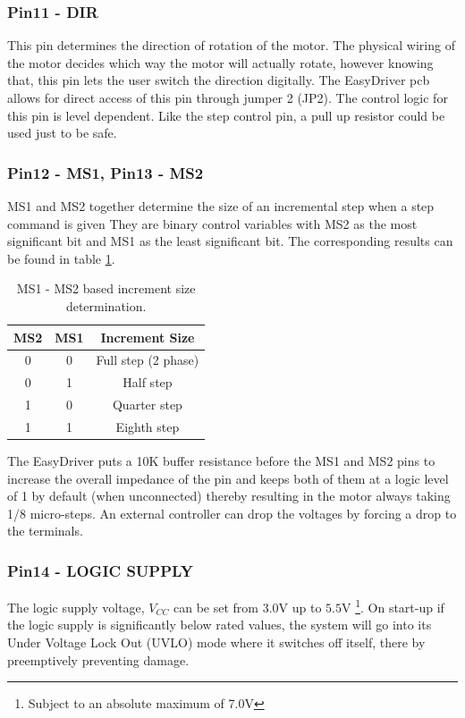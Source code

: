 \documentclass{article}
\theoremstyle{plain}
\theoremstyle{definition}
\theoremstyle{remark}
\begin{document}
\subsubsection*{Pin11 - DIR}
This pin determines the direction of rotation of the motor. The physical wiring of the motor decides which way the motor will actually rotate, however knowing that, this pin lets the user switch the direction digitally. The EasyDriver pcb allows for direct access of this pin through jumper 2 (JP2). The control logic for this pin is level dependent. Like the step control pin, a  pull up resistor could be used just to be safe.\\

\subsubsection*{Pin12 - MS1, Pin13 - MS2}
MS1 and MS2 together determine the size of an incremental step when a step command is given They are binary control variables with MS2 as the most significant bit and MS1 as the least significant bit. The corresponding results can be found in table \ref{q1_b3}.\\

\begin{table}[htb]
\begin{center}
    \begin{tabular}{|c|c|c|}
        \hline
        MS2 & MS1  & Increment Size          \\ \hline
        0   & 0    & Full step (2 phase) \\ 
        0   & 1    & Half step           \\ 
        1   & 0    & Quarter step        \\ 
        1   & 1    & Eighth step         \\
        \hline
    \end{tabular}
\caption{MS1 - MS2 based increment size determination.}
\label{q1_b3}
\end{center}
\end{table}

The EasyDriver puts a 10K buffer resistance before the MS1 and MS2 pins to increase the overall impedance of the pin and keeps both of them at a logic level of 1 by default (when unconnected) thereby resulting in the motor always taking 1/8 micro-steps. An external controller can drop the voltages by forcing a drop to the terminals.

\subsubsection*{Pin14 - LOGIC SUPPLY}
The logic supply voltage, $V_{CC}$  can be set from $3.0$V up to $5.5$V \footnote{Subject to an absolute maximum of 7.0V}. On start-up if the logic supply is significantly below rated values, the system will go into its Under Voltage Lock Out (UVLO) mode where it switches off itself, there by preemptively preventing damage.\\
\end{document}
